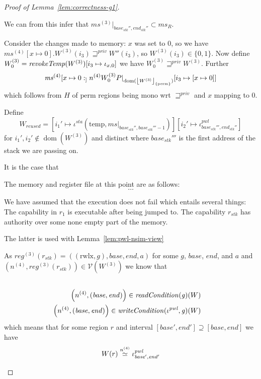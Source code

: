\documentclass[a4paper]{article}
\DeclarePairedDelimiter\floor{\lfloor}{\rfloor}
\renewcommand{\nsim}[1][n]{\stackrel{\tiny{#1}}{\simeq}}
\DeclareMathOperator{\dom}{dom}
\newcommand{\var}[1]{\mathit{#1}}
\newcommand{\hs}{\var{ms}}
\newcommand{\ms}{\hs}
\newcommand{\gl}{\var{g}}
\newcommand{\addr}{\var{a}}
\newcommand{\start}{\var{base}}
\newcommand{\addrend}{\var{end}}
\newcommand{\reg}{\var{reg}}
\newcommand{\heap}{\var{mem}}
\newcommand{\stk}{\var{stk}}
\newcommand{\pwl}{\var{pwl}}
\newcommand{\sta}{\var{sta}}
\newcommand{\plainfun}[2]{
  \ifthenelse{\equal{#2}{}}
  {\mathit{#1}}
  {\mathit{#1}(#2)}
}
\newcommand{\readCond}[1]{\plainfun{readCondition}{#1}}
\newcommand{\writeCond}[1]{\plainfun{writeCondition}{#1}}
\newcommand{\revokeTemp}[1]{\plainfun{revokeTemp}{#1}}
\newcommand{\erase}[2]{\floor*{#1}_{\{#2\}}}
\newcommand{\futurestr}{\mathbin{\sqsupseteq}^{\var{priv}}}
\newcommand{\heapSat}[3][\heap]{#1 :_{#2} #3}
\newcommand{\memSat}[3][n]{\heapSat[#2]{#1}{#3}}
\newcommand{\asmType}{\plaindom{AsmType}}
\newcommand{\plaindom}[1]{\mathrm{#1}}
\newcommand{\intr}[2]{\mathcal{#1}}
\newcommand{\valueintr}[1]{\intr{V}{#1}}
\newcommand{\stdvr}{\valueintr{\asmType}}
\newcommand{\npair}[2][n]{\left(#1,#2 \right)}
\newcommand{\plainperm}[1]{\mathrm{#1}}
\newcommand{\rwlx}{\plainperm{rwlx}}
\newcommand{\plainview}[1]{\mathrm{#1}}
\newcommand{\perma}{\plainview{perm}}
\newcommand{\temp}{\plainview{temp}}
\begin{document}
\begin{lemma}
\begin{proof}[Proof of Lemma~\ref{lem:correctness-g1}]
\begin{enumproof}
\begin{enumproof}
\begin{enumproof}
\begin{enumproof}
          We can from this infer that $\ms^{(3)} |_{\start_\stk'',\addrend_\stk''} \subset \ms_R$.

          Consider the changes made to memory: $x$ was set to 0, so we have $\ms^{(4)}[x \mapsto 0]$.$W^{(3)}(i_3) \futurestr W''(i_3)$, so $W^{(3)}(i_3) \in \{0,1\}$. Now define $W^{(3)}_0 = \revokeTemp{W^{(3)}}[i_3 \mapsto \iota_{x,0}]$ we have $W^{(3)}_0 \futurestr W^{(3)}$. Further
          \[
            \memSat[n^{(4)}]{\ms^{(4)}[x \mapsto 0]}{W^{(3)}_0}{P|_{\dom(\erase{W^{(3)}}{\perma})}[i_3 \mapsto [x \mapsto 0]]}
          \]
          which follows from $H$ of $\perma$ regions being mono wrt $\futurestr$ and $x$ mapping to 0.

          Define 
          \[
            W_{\var{reused}} = [i_1' \mapsto \iota^\sta (\temp,\ms|_{\start_\stk'',\start_\stk'''-1})][i_2' \mapsto \iota^\pwl_{\start_\stk''',\addrend_\stk''}]
          \]
          for $i_1',i_2' \not\in \dom(W^{(3)})$ and distinct where $\start_\stk'''$ is the first address of the stack we are passing on.
          
          It is the case that 




          The memory and register file at this point are as follows: %
          \[
            \dots  
          \]

          We have assumed that the execution does not fail which entails several things: The capability in $r_1$ is executable after being jumped to. The capability $r_\stk$ has authority over some none empty part of the memory.

          The latter is used with Lemma~\ref{lem:pwl-nsim-view} 

          As $\reg^{(3)}(r_\stk) = ((\rwlx,\gl),\start,\addrend,\addr)$ for some $\gl$, $\start$, $\addrend$, and $\addr$ and $\npair[n^{(4)}]{\reg^{(3)}(r_\stk)} \in \stdvr(W^{(3)})$ we know that
          \begin{align*}
            \\ \npair[n^{(4)}]{(\start,\addrend)} \in \readCond{}(\gl)(W) &
            \\ \npair[n^{(4)}]{(\start,\addrend)} \in \writeCond{}(\iota^\pwl,\gl)(W)
          \end{align*}
          which means that for some region $r$ and interval $[\start',\addrend'] \supseteq [\start,\addrend]$ we have 
          \[
            W(r) \nsim[n^{(4)}] \iota^\pwl_{\start',\addrend'}
          \]
          

\end{enumproof}
\end{enumproof}
\end{enumproof}
\end{enumproof}
\end{proof}
\end{lemma}
\end{document}
